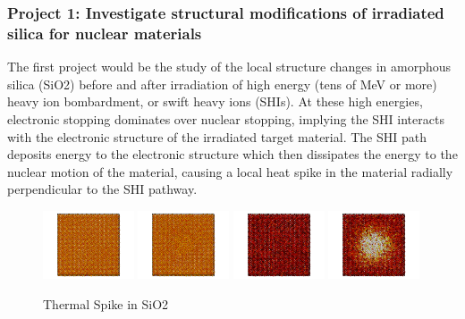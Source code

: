 \subsubsection*{Project 1: Investigate structural modifications of irradiated silica for nuclear materials}\label{lang}

The first project would be the study of the local structure changes in amorphous silica (SiO2) before and after irradiation of high energy
(tens of MeV or more) heavy ion bombardment, or swift heavy ions (SHIs). At these high energies, electronic stopping dominates over nuclear stopping, implying the SHI interacts with the electronic structure of the irradiated target material. The SHI path deposits energy to the electronic structure which then dissipates the energy to the nuclear motion of the material, causing a local heat spike in the material radially perpendicular to the SHI pathway. 

\begin{figure}
  \begin{center}
    \includegraphics[width=0.24\textwidth]{graphics/initial_atoms.png}
    \includegraphics[width=0.24\textwidth]{graphics/spike_atoms.png}
    \includegraphics[width=0.24\textwidth]{graphics/initial.png}
    \includegraphics[width=0.24\textwidth]{graphics/spike.png}
  \end{center}
  \caption{Thermal Spike in SiO2}
\end{figure}

